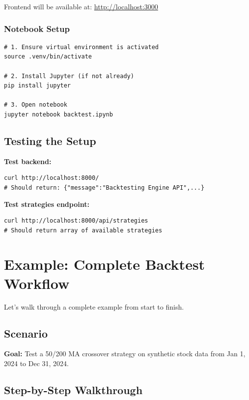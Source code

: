 \documentclass[11pt,a4paper]{article}
\begin{document}
Frontend will be available at: \url{http://localhost:3000}

\subsubsection{Notebook Setup}

\begin{lstlisting}[style=shellcode]
# 1. Ensure virtual environment is activated
source .venv/bin/activate

# 2. Install Jupyter (if not already)
pip install jupyter

# 3. Open notebook
jupyter notebook backtest.ipynb
\end{lstlisting}

\subsection{Testing the Setup}

\textbf{Test backend:}
\begin{lstlisting}[style=shellcode]
curl http://localhost:8000/
# Should return: {"message":"Backtesting Engine API",...}
\end{lstlisting}

\textbf{Test strategies endpoint:}
\begin{lstlisting}[style=shellcode]
curl http://localhost:8000/api/strategies
# Should return array of available strategies
\end{lstlisting}

\section{Example: Complete Backtest Workflow}

Let's walk through a complete example from start to finish.

\subsection{Scenario}

\textbf{Goal:} Test a 50/200 MA crossover strategy on synthetic stock data from Jan 1, 2024 to Dec 31, 2024.

\subsection{Step-by-Step Walkthrough}
\end{document}
